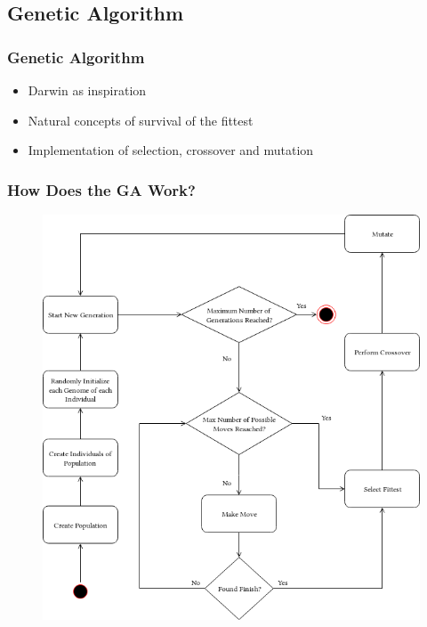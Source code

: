 \documentclass{beamer}
\begin{document}
\subsection{Genetic Algorithm}
\begin{frame}
    \frametitle{Genetic Algorithm}

    \begin{itemize}
        \item Darwin as inspiration
        \item Natural concepts of survival of the fittest
        \item Implementation of selection, crossover and mutation
    \end{itemize}

\end{frame}

\begin{frame}
    \frametitle{How Does the GA Work?}
    \begin{figure}
        \includegraphics[scale=0.3]{resources/GeneticAlgorithm.png}

    \end{figure}

\end{frame}
\end{document}
